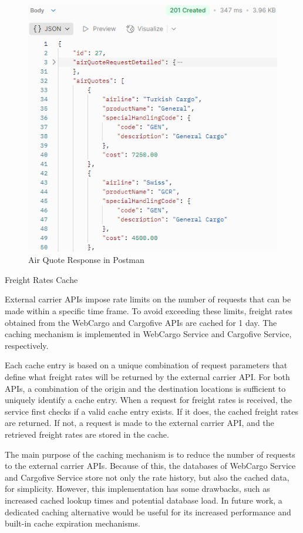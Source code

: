 \documentclass[12pt, reqno]{amsbook}
\makeatletter
\def\subsection{\@startsection{subsection}{2}%
      \z@{.5\linespacing\@plus.7\linespacing}{.25\linespacing}%
      {\normalfont\bfseries\flushleft}}
\theoremstyle{definition}
\theoremstyle{definition}
\numberwithin{section}{chapter}
\numberwithin{table}{chapter}
\numberwithin{figure}{chapter}
\makeatother
\begin{document}
\begin{figure}[H]
  \centering
  \includegraphics[width=0.8\linewidth]{images/AirQuoteResponsePostman.png}
  \caption{\label{Figure:AirQuoteResponsePostman}Air Quote Response in Postman}
\end{figure}

\subsection{Freight Rates Cache}
\label{Subsection:Freight_Rates_Cache}

External carrier \acp{API} impose rate limits on the number of requests that can be made within a specific time frame. To avoid exceeding these limits, freight rates obtained from the WebCargo and Cargofive \Acp{API} are cached for 1 day. The caching mechanism is implemented in WebCargo Service and Cargofive Service, respectively.

Each cache entry is based on a unique combination of request parameters that define what freight rates will be returned by the external carrier \ac{API}. For both \acp{API}, a combination of the origin and the destination locations is sufficient to uniquely identify a cache entry. When a request for freight rates is received, the service first checks if a valid cache entry exists. If it does, the cached freight rates are returned. If not, a request is made to the external carrier \ac{API}, and the retrieved freight rates are stored in the cache.

The main purpose of the caching mechanism is to reduce the number of requests to the external carrier \acp{API}. Because of this, the databases of WebCargo Service and Cargofive Service store not only the rate history, but also the cached data, for simplicity. However, this implementation has some drawbacks, such as increased cached lookup times and potential database load. In future work, a dedicated caching alternative would be useful for its increased performance and built-in cache expiration mechanisms.
\end{document}
